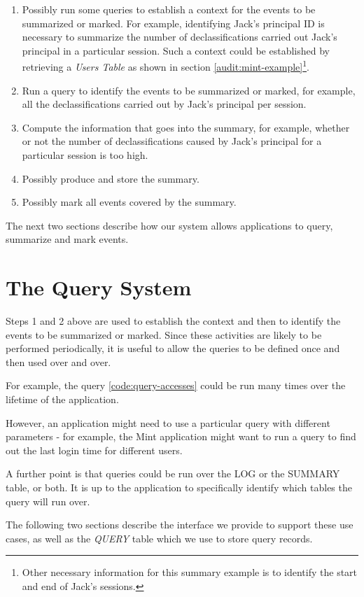 \begin{enumerate}
  \item Possibly run some queries to establish a context for the events to be summarized or marked. For example, identifying Jack's principal ID is necessary to summarize the number of declassifications carried out Jack's principal in a particular session. Such a context could be established by retrieving a \emph{Users Table} as shown in section \ref{audit:mint-example}\footnote{Other necessary information for this summary example is to identify the start and end of Jack's sessions.}.
  \item Run a query to identify the events to be summarized or marked, for example, all the declassifications carried out by Jack's principal per session.
  \item Compute the information that goes into the summary, for example, whether or not the number of declassifications caused by Jack's principal for a particular session is too high.
  \item Possibly produce and store the summary.
  \item Possibly mark all events covered by the summary.
\end{enumerate}

\noindent
The next two sections describe how our system allows applications to query, summarize and mark events.

\section{The Query System}

Steps 1 and 2 above are used to establish the context and then to identify the events to be summarized or marked. Since these activities are likely to be performed periodically, it is useful to allow the queries to be defined once and then used over and over.


For example, the query \ref{code:query-accesses} could be run many times over the lifetime of the application.

However, an application might need to use a particular query with different parameters - for example, the Mint application might want to run a query to find out the last login time for different users.

A further point is that queries could be run over the LOG or the SUMMARY table, or both. It is up to the application to specifically identify which tables the query will run over.

The following two sections describe the interface we provide to support these use cases, as well as the \emph{QUERY} table which we use to store query records.

